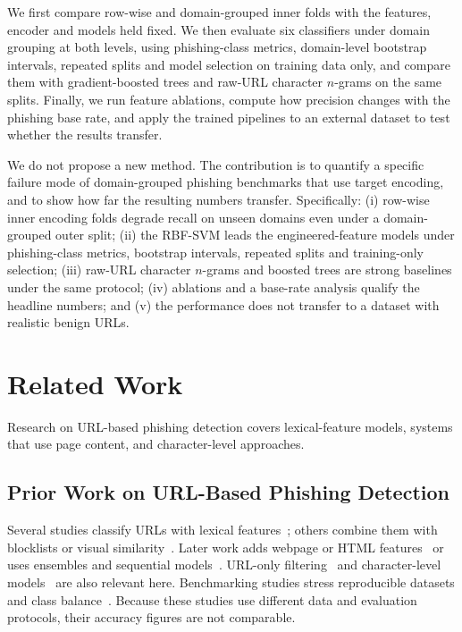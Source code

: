 \documentclass[conference]{IEEEtran}
\begin{document}
We first compare row-wise and domain-grouped inner folds with the features, encoder and models held fixed. We then evaluate six classifiers under domain grouping at both levels, using phishing-class metrics, domain-level bootstrap intervals, repeated splits and model selection on training data only, and compare them with gradient-boosted trees and raw-URL character $n$-grams on the same splits. Finally, we run feature ablations, compute how precision changes with the phishing base rate, and apply the trained pipelines to an external dataset to test whether the results transfer.

We do not propose a new method. The contribution is to quantify a specific failure mode of domain-grouped phishing benchmarks that use target encoding, and to show how far the resulting numbers transfer. Specifically: (i) row-wise inner encoding folds degrade recall on unseen domains even under a domain-grouped outer split; (ii) the RBF-SVM leads the engineered-feature models under phishing-class metrics, bootstrap intervals, repeated splits and training-only selection; (iii) raw-URL character $n$-grams and boosted trees are strong baselines under the same protocol; (iv) ablations and a base-rate analysis qualify the headline numbers; and (v) the performance does not transfer to a dataset with realistic benign URLs.

\section{Related Work}
Research on URL-based phishing detection covers lexical-feature models, systems that use page content, and character-level approaches.

\subsection{Prior Work on URL-Based Phishing Detection}
Several studies classify URLs with lexical features~\cite{gupta2021,butnaru2021}; others combine them with blocklists or visual similarity~\cite{rao2020}. Later work adds webpage or HTML features~\cite{asiri2023,aljofey2022} or uses ensembles and sequential models~\cite{karim2023,aslam2024}. URL-only filtering~\cite{alani2022} and character-level models~\cite{alshehri2022} are also relevant here. Benchmarking studies stress reproducible datasets and class balance~\cite{elaassal2020,hannousse2021}. Because these studies use different data and evaluation protocols, their accuracy figures are not comparable.
\end{document}
